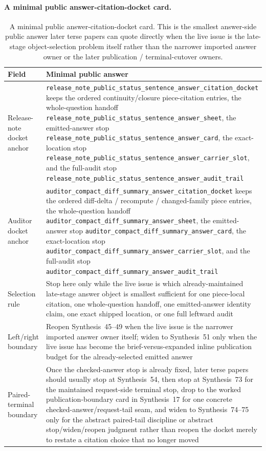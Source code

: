 \documentclass[11pt]{article}
\begin{document}
\paragraph{A minimal public answer-citation-docket card.}
\begin{table}[t]
\centering
\small
\begin{tabularx}{\linewidth}{@{}lX@{}}
\toprule
Field & Minimal public answer \\
\midrule
Release-note docket anchor & \nolinkurl{release_note_public_status_sentence_answer_citation_docket} keeps the ordered continuity/closure piece-citation entries, the whole-question handoff \nolinkurl{release_note_public_status_sentence_answer_sheet}, the emitted-answer stop \nolinkurl{release_note_public_status_sentence_answer_card}, the exact-location stop \nolinkurl{release_note_public_status_sentence_answer_carrier_slot}, and the full-audit stop \nolinkurl{release_note_public_status_sentence_answer_audit_trail} \\
Auditor docket anchor & \nolinkurl{auditor_compact_diff_summary_answer_citation_docket} keeps the ordered diff-delta / recompute / changed-family piece entries, the whole-question handoff \nolinkurl{auditor_compact_diff_summary_answer_sheet}, the emitted-answer stop \nolinkurl{auditor_compact_diff_summary_answer_card}, the exact-location stop \nolinkurl{auditor_compact_diff_summary_answer_carrier_slot}, and the full-audit stop \nolinkurl{auditor_compact_diff_summary_answer_audit_trail} \\
Selection rule & Stop here only while the live issue is which already-maintained late-stage answer object is smallest sufficient for one piece-local citation, one whole-question handoff, one emitted-answer identity claim, one exact shipped location, or one full leftward audit \\
Left/right boundary & Reopen Synthesis~45--49 when the live issue is the narrower imported answer owner itself; widen to Synthesis~51 only when the live issue has become the brief-versus-expanded inline publication budget for the already-selected emitted answer \\
Paired-terminal boundary & Once the checked-answer stop is already fixed, later terse papers should usually stop at Synthesis~54, then stop at Synthesis~73 for the maintained request-side terminal stop, drop to the worked publication-boundary card in Synthesis~17 for one concrete checked-answer/request-tail seam, and widen to Synthesis~74--75 only for the abstract paired-tail discipline or abstract stop/widen/reopen judgment rather than reopen the docket merely to restate a citation choice that no longer moved \\
\bottomrule
\end{tabularx}
\caption{A minimal public answer-citation-docket card. This is the smallest answer-side public answer later terse papers can quote directly when the live issue is the late-stage object-selection problem itself rather than the narrower imported answer owner or the later publication / terminal-cutover owners.}
\label{tab:minimal-public-answer-citation-docket-card}
\end{table}
\end{document}
